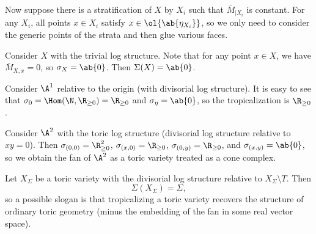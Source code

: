 Now suppose there is a stratification of \(X\) by \(X_i\) such that \(\bar{M}_{|X_i}\) is constant. For any \(X_i\), all points \(x \in X_i\) satisfy \(x \in \ol{\ab\{\eta_{X_i}\}}\), so we only need to consider the generic points of the strata and then glue various faces. 

\begin{exm}
    Consider \(X\) with the trivial log structure. Note that for any point \(x \in X\), we have \(\bar{M}_{X,x} = 0\), so \(\sigma_X = \ab\{0\}\). Then \(\Sigma(X) = \ab\{0\}\).
\end{exm}

\begin{exm}
    Consider \(\A^1\) relative to the origin (with divisorial log structure). It is easy to see that \(\sigma_0 = \Hom(\N, \R_{\geq 0}) = \R_{\geq 0}\) and \(\sigma_{\eta} = \ab\{0\}\), so the tropicalization is \(\R_{\geq 0}\).
\end{exm}

\begin{exm}
    Consider \(\A^2\) with the toric log structure (divisorial log structure relative to \(xy = 0\)). Then \(\sigma_{(0,0)} = \R^2_{\geq 0}\), \(\sigma_{(x,0)} = \R_{\geq 0}\), \(\sigma_{(0,y)} = \R_{\geq 0}\), and \(\sigma_{(x,y)} = \ab\{0\}\), so we obtain the fan of \(\A^2\) as a toric variety treated as a cone complex.
\end{exm}

\begin{exm}
    Let \(X_{\Sigma}\) be a toric variety with the divisorial log structure relative to \(X_{\Sigma} \setminus T\). Then
    \[ \Sigma(X_{\Sigma}) = \Sigma, \]
    so a possible slogan is that tropicalizing a toric variety recovers the structure of ordinary toric geometry (minus the embedding of the fan in some real vector space).
\end{exm}

